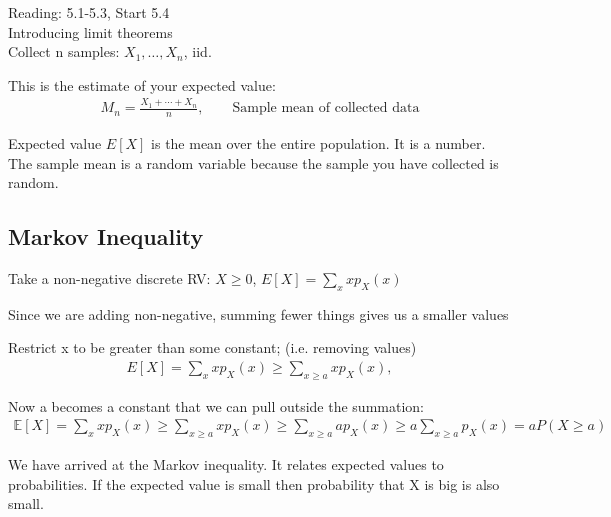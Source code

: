 Reading: 5.1-5.3, Start 5.4
\\
Introducing limit theorems\\

Collect n samples:  $X_1,\ldots, X_n$, iid.

This is the estimate of your expected value:
\begin{align*}
    M_n = \frac{X_1 +\cdots + X_n}{n}, \qquad \text{Sample mean of collected data}
\end{align*}

 Expected value $E[X]$ is the mean over the entire population.  It is a number.
The sample mean is a random variable because the sample you have collected is random.

\subsection{Markov Inequality}


Take a non-negative discrete RV: $X \ge 0$, $E[X] = \sum_x x p_X(x)$

Since we are adding non-negative,  summing fewer things gives us a smaller values

Restrict x to be greater than some constant; (i.e. removing values)
\begin{align*}
    E[X] = \sum_x x p_X(x) \ge \sum_{x\ge a} x p_X(x), 
\end{align*}



 Now a becomes a constant that we can pull outside the summation:
\begin{align*}
    \mathbb{E}[X] = \sum_x x p_X(x) \ge \sum_{x\ge a} x p_X(x) \ge  \sum_{x \ge a} a p_X(x) \ge a \sum_{x\ge a} p_X(x) = a P(X \ge a)
\end{align*}

We have arrived at the Markov inequality.  It relates expected values to probabilities.  If the expected value is small then probability that X is big is also small.

